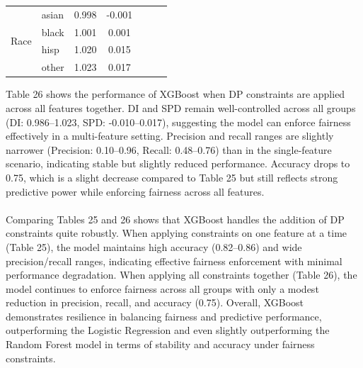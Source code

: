 \documentclass{article}
\begin{document}
\begin{table}[H]
\begin{tabular}{llcc|ccc}
\cline{1-4}
\multirow{4}{*}{Race}          & asian & 0.998                  & \multicolumn{1}{c|}{-0.001} &                                       &                                    &                              \\
                               & black & 1.001                  & \multicolumn{1}{c|}{0.001}  &                                       &                                    &                              \\
                               & hisp  & 1.020                  & \multicolumn{1}{c|}{0.015}  &                                       &                                    &                              \\
                               & other & 1.023                  & \multicolumn{1}{c|}{0.017}  &                                       &                                    &                             
\end{tabular}
\end{table}
Table 26 shows the performance of XGBoost when DP constraints are applied across all features together. DI and SPD remain well-controlled across all groups (DI: 0.986–1.023, SPD: -0.010–0.017), suggesting the model can enforce fairness effectively in a multi-feature setting. Precision and recall ranges are slightly narrower (Precision: 0.10–0.96, Recall: 0.48–0.76) than in the single-feature scenario, indicating stable but slightly reduced performance. Accuracy drops to 0.75, which is a slight decrease compared to Table 25 but still reflects strong predictive power while enforcing fairness across all features.\\ \\
Comparing Tables 25 and 26 shows that XGBoost handles the addition of DP constraints quite robustly. When applying constraints on one feature at a time (Table 25), the model maintains high accuracy (0.82–0.86) and wide precision/recall ranges, indicating effective fairness enforcement with minimal performance degradation. When applying all constraints together (Table 26), the model continues to enforce fairness across all groups with only a modest reduction in precision, recall, and accuracy (0.75). Overall, XGBoost demonstrates resilience in balancing fairness and predictive performance, outperforming the Logistic Regression and even slightly outperforming the Random Forest model in terms of stability and accuracy under fairness constraints.
\end{document}
